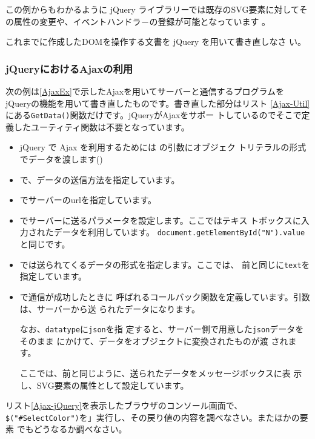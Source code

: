 この例からもわかるように jQuery ライブラリーでは既存のSVG要素に対してそ
の属性の変更や、イベントハンドラ－の登録が可能となっています
\iffalse\footnote{\Operan や\FF で確認したところではSVGの要素を指定して、新規に
オブジェクトを作成することはできますが、それをSVG要素として表示すること
はできませんでした。一部の属性はCSSの方で定義されてしまいました。これは
要素を作成するときの名前空間がHTMLにしか適応していないためと思われま
す。}\fi 。
\begin{Problem}\upshape
 これまでに作成したDOMを操作する\HTML 文書を jQuery を用いて書き直しなさ
 い。
\end{Problem}
\subsubsection{jQueryにおけるAjaxの利用}
次の例は\ref{AjaxEx}で示したAjaxを用いてサーバーと通信するプログラムを
jQueryの機能を用いて書き直したものです。書き直した部分はリスト
\ref{Ajax-Util}にある\texttt{GetData()}関数だけです。jQueryがAjaxをサポー
トしているのでそこで定義したユーティティ関数は不要となっています。

\begin{itemize}
 \item jQuery で Ajax を利用するためには  の引数にオブジェク
			 トリテラルの形式でデータを渡します()
 \item {}で、データの送信方法を指定しています。
 \item {}でサーバーのurlを指定しています。
 \item {}でサーバーに送るパラメータを設定します。ここではテキス
			 トボックスに入力されたデータを利用しています。
			 \texttt{document.getElementById("N").value}と同じです。
 \item {}では送られてくるデータの形式を指定します。ここでは、
			 前と同じに\texttt{text}を指定しています。

 \item {}で通信が成功したときに
			 呼ばれるコールバック関数を定義しています。引数は、サーバーから送
			 られたデータになります。
			 
			 なお、\texttt{datatype}に\texttt{json}を指
			 定すると、サーバー側で用意した\texttt{json}データをそのまま
			 にかけて、データをオブジェクトに変換されたものが渡
			 されます。

			 ここでは、前と同じように、送られたデータをメッセージボックスに表
			 示し、SVG要素の属性として設定しています。
\end{itemize}
\begin{Problem}\upshape
リスト\ref{Ajax-jQuery}を表示したブラウザのコンソール画面で、
 \texttt{\$("\#SelectColor")}を」実行し、その戻り値の内容を調べなさい。またほかの要素
 でもどうなるか調べなさい。
\end{Problem}
